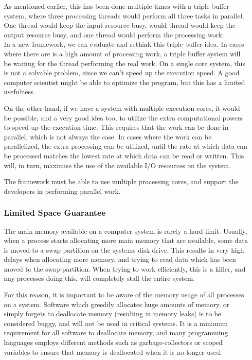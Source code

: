 \documentclass[a4paper]{article}
\begin{document}
As mentioned earlier, this has been done multiple times with a triple buffer system, where three processing threads would perform all three tasks in parallel. One thread would keep the input resource busy, would thread would keep the output resource busy, and one thread would perform the processing work.\\
 

In a new framework, we can evaluate and rethink this triple-buffer-idea. In cases where there are is a high amount of processing work, a triple buffer system will be waiting for the thread performing the real work. On a single core system, this is not a solvable problem, since we can't speed up the execution speed. A good computer scientist might be able to optimize the program, but this has a limited usefulness. 

On the other hand, if we have a system with multiple execution cores, it would be possible, and a very good idea too, to utilize the extra computational powers to speed up the execution time. This requires that the work can be done in parallel, which is not always the case. In cases where the work can be parallelized, the extra processing can be utilized, until the rate at which data can be processed matches the lowest rate at which data can be read or written. This will, in turn, maximise the use of the available I/O resources on the system.

The framework must be able to use multiple processing cores, and support the developers in performing parallel work.


\subsubsection{Limited Space Guarantee}
The main memory available on a computer system is rarely a hard limit. Usually, when a process starts allocating more main memory that are available, some data is moved to a swap-partition on the systems disk drive. This results in very high delays when allocating more memory, and trying to read data which has been moved to the swap-partition. When trying to work efficiently, this is a killer, and any processes doing this, will completely stall the entire system. 

For this reason, it is important to be aware of the memory usage of all processes on a system. Software which greedily allocates huge amounts of memory, or simply forgets to deallocate memory (resulting in memory leaks) is to be considered buggy, and will not be used in critical systems. It is a minimum requirement for all software to deallocate memory, and many programming languages employs different methods such as garbage-collectors or scoped variables to ensure that memory is deallocated when it is no longer used.\\
\end{document}
